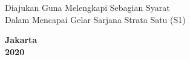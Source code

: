 \vspace{1cm}

\begin{center}
  Diajukan Guna Melengkapi Sebagian Syarat \\
  Dalam Mencapai Gelar Sarjana Strata Satu (S1)\\
\end{center}


\begin{center}

  \bfseries
  Jakarta\\
  2020 %
\end{center}
